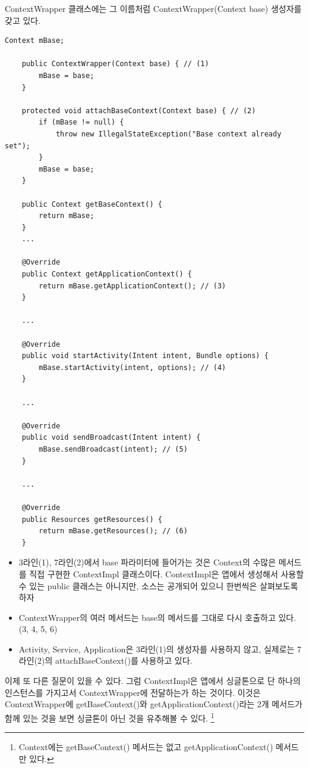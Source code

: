 ContextWrapper 클래스에는 그 이름처럼 ContextWrapper(Context base) 생성자를 갖고 있다.
\begin{lstlisting}[frame=single, caption=ContextWrapper.java]
    Context mBase;

    public ContextWrapper(Context base) { // (1)
        mBase = base;
    }

	protected void attachBaseContext(Context base) { // (2)
        if (mBase != null) {
            throw new IllegalStateException("Base context already set");
        }
        mBase = base;
    }
    
    public Context getBaseContext() {
        return mBase;
    }
    ...
    
    @Override
    public Context getApplicationContext() {
        return mBase.getApplicationContext(); // (3)
    }
    
    ...
    
    @Override
    public void startActivity(Intent intent, Bundle options) {
        mBase.startActivity(intent, options); // (4)
    }
    
    ...
    
    @Override
    public void sendBroadcast(Intent intent) {
        mBase.sendBroadcast(intent); // (5)
    }

	... 
	
    @Override
    public Resources getResources() {
        return mBase.getResources(); // (6)
    }
\end{lstlisting}
\begin{itemize}
\item 3라인(1), 7라인(2)에서 base 파라미터에 들어가는 것은 Context의 수많은 메서드를 직접 구현한 ContextImpl 클래스이다. ContextImpl은 앱에서 생성해서 사용할 수 있는 public 클래스는 아니지만, 소스는 공개되어 있으니 한번씩은 살펴보도록 하자
\item ContextWrapper의 여러 메서드는 base의 메서드를 그대로 다시 호출하고 있다.(3, 4, 5, 6)
\item Activity, Service, Application은 3라인(1)의 생성자를 사용하지 않고, 실제로는 7라인(2)의 attachBaseContext()를 사용하고 있다.
\end{itemize}

이제 또 다른 질문이 있을 수 있다. 그럼 ContextImpl은 앱에서 싱글톤으로 단 하나의 인스턴스를 가지고서 ContextWrapper에 전달하는가 하는 것이다.
이것은 ContextWrapper에 getBaseContext()와 getApplicationContext()라는 2개 메서드가 함께 있는 것을 보면 싱글톤이 아닌 것을 유추해볼 수 있다. \footnote{Context에는 getBaseContext() 메서드는 없고 getApplicationContext() 메서드만 있다.}\\

